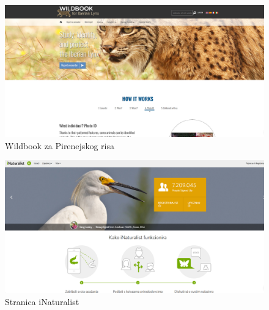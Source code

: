 		\begin{figure}[H]
		    \includegraphics[scale=0.25]{slike/wildbook_ris.PNG} %
			\centering
			\caption{Wildbook za Pirenejskog risa}
			\label{fig:promjene}
		\end{figure}
		
		\begin{figure}[H]
			\includegraphics[scale=0.25]{slike/stranica_inaturalist.PNG} %
			\centering
			\caption{Stranica iNaturalist}
			\label{fig:promjene}
		\end{figure}